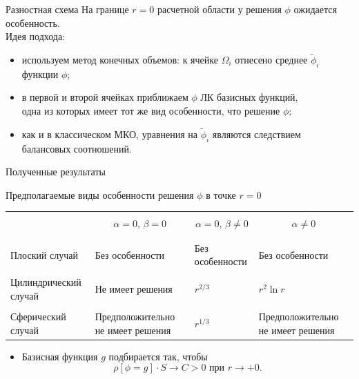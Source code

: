 \begin{frame}{Разностная схема}
\parind На границе $r = 0$ расчетной области у решения $\phi$ ожидается особенность. \\[3mm]
\parind Идея подхода:
\begin{itemize}
    \item используем метод конечных объемов: к ячейке $\Omega_i$ отнесено среднее $\widetilde{\phi}_i$ функции $\phi$;
    \item в первой и второй ячейках приближаем $\phi$ ЛК базисных функций, \\ одна из которых имеет тот же вид особенности, что решение $\phi$;
    \item как и в классическом МКО, уравнения на $\widetilde{\phi}_i$ являются следствием \\ балансовых соотношений.
\end{itemize}
\end{frame}


\begin{frame}{Полученные результаты}
\vspace{-3mm}
\begin{center}
    Предполагаемые виды особенности решения $\phi$ в точке $r = 0$
\end{center}
\vspace{-1mm}
\begin{tabular}{|m{3cm}||m{3.5cm}|m{3.5cm}|m{3.5cm}|}
    \hline
    &&& \\[-3mm]
    &
    \multicolumn{1}{c}{$\alpha = 0$, $\beta = 0$} &
    \multicolumn{1}{c}{$\alpha = 0$, $\beta \neq 0$} &
    \multicolumn{1}{c}{$\alpha \neq 0$} \\[-2mm]
    &&& \\[-1.5mm]
    \hline
    \hline
    &&& \\[-3.5mm]
    Плоский \linebreak случай & \textcolor{dark_green}{Без особенности} & \textcolor{dark_green}{Без особенности} & \textcolor{dark_green}{Без особенности} \\[3.5mm]
    \hline
    &&& \\[-3.5mm]
    Цилиндрический \linebreak случай & \textcolor{dark_red}{Не имеет решения} & $r^{2/3}$ & $r^2 \ln r$ \\[3.5mm]
    \hline
    &&& \\[-3.5mm]
    Сферический \linebreak случай & \textcolor{dark_red}{Предположительно не имеет решения} & $r^{1/3}$ & \textcolor{dark_red}{Предположительно не имеет решения} \\[3.5mm]
    \hline
\end{tabular}
\begin{itemize}
    \item Базисная функция $g$ подбирается так, чтобы
    \vspace{-0.2cm}
    $$\rho[\phi = g] \cdot S \to C > 0 \text{ при } r \to +0.$$
\end{itemize}
\end{frame}


